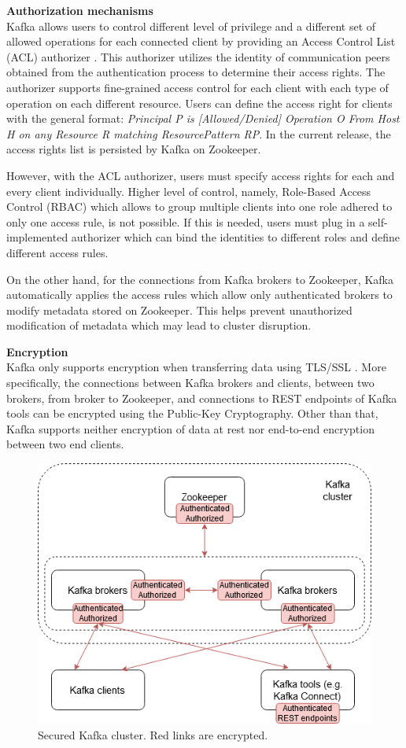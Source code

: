 \textbf{Authorization mechanisms}\\
Kafka allows users to control different level of privilege and a different set of allowed operations for each connected client by providing an Access Control List (ACL) authorizer \cite{kafkasecurity}. This authorizer utilizes the identity of communication peers obtained from the authentication process to determine their access rights. The authorizer supports fine-grained access control for each client with each type of operation on each different resource. Users can define the access right for clients with the general format: \emph{Principal P is [Allowed/Denied] Operation O From Host H on any Resource R matching ResourcePattern RP}. In the current release, the access rights list is persisted by Kafka on Zookeeper. 

However, with the ACL authorizer, users must specify access rights for each and every client individually. Higher level of control, namely, Role-Based Access Control (RBAC) which allows to group multiple clients into one role adhered to only one access rule, is not possible. If this is needed, users must plug in a self-implemented authorizer which can bind the identities to different roles and define different access rules. 

On the other hand, for the connections from Kafka brokers to Zookeeper, Kafka automatically applies the access rules which allow only authenticated brokers to modify metadata stored on Zookeeper. This helps prevent unauthorized modification of metadata which may lead to cluster disruption.

\textbf{Encryption}\\
Kafka only supports encryption when transferring data using TLS/SSL \cite{kafkasecurity}. More specifically, the connections between Kafka brokers and clients, between two brokers, from broker to Zookeeper, and connections to REST endpoints of Kafka tools can be encrypted using the Public-Key Cryptography. Other than that, Kafka supports neither encryption of data at rest nor end-to-end encryption between two end clients.  

\begin{figure}[h]
	\centering
	\includegraphics[width=11.5cm]{images/security-kafka.png}
	\caption{Secured Kafka cluster. Red links are encrypted.}
	\label{fig:securitykafka}
\end{figure}

